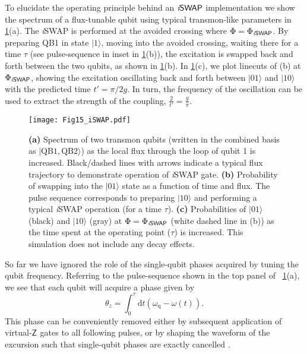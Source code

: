 \documentclass[aip,apr,twocolumn,showpacs,superscriptaddress,groupedaddress,nofootinbib,reprint]{revtex4-1}  %
\newcommand{\Z}[1]{\textsf{Z}_{#1}}
\newcommand{\iSWAP}{\emph{i}\textsf{SWAP}}
\renewcommand{\d}{\text{d}}
\begin{document}
To elucidate the operating principle behind an $\iSWAP{}$ implementation we show the spectrum of a flux-tunable qubit using typical transmon-like parameters in \cref{Fig:2qb_iSWAP}(a). The \iSWAP{} is performed at the avoided crossing where $\Phi = \Phi_{\iSWAP{}}$. By preparing QB1 in state $|1\rangle$, moving into the avoided crossing, waiting there for a time $\tau$ (see pulse-sequence in inset in \cref{Fig:2qb_iSWAP}(b)), the excitation is swapped back and forth between the two qubits, as shown in \cref{Fig:2qb_iSWAP}(b). In \cref{Fig:2qb_iSWAP}(c), we plot linecuts of (b) at $\Phi_{\iSWAP{}}$, showing the excitation oscillating back and forth between $|01\rangle$ and $|10\rangle$ with the predicted time $t' = \pi/2g$. In turn, the frequency of the oscillation can be used to extract the strength of the coupling, $\frac{2}{t'} = \frac{g}{\pi}$.
\begin{figure}[!t]
\begin{center}
\texttt{[image: Fig15\_iSWAP.pdf]}
\caption{\textbf{(a)} Spectrum of two transmon qubits (written in the combined basis as $|\text{QB1},\text{QB2}\rangle$) as the local flux through the loop of qubit 1 is increased. Black/dashed lines with arrows indicate a typical flux trajectory to demonstrate operation of \iSWAP{} gate. \textbf{(b)} Probability of swapping into the $|01\rangle$ state as a function of time and flux. The pulse sequence corresponds to preparing $|10\rangle$ and performing a typical \iSWAP{} operation (for a time $\tau$). \textbf{(c)} Probabilities of $|01\rangle$ (black) and $|10\rangle$ (gray) at $\Phi = \Phi_{\iSWAP{}}$ (white dashed line in (b)) as the time spent at the operating point ($\tau$) is increased. This simulation does not include any decay effects.}
\label{Fig:2qb_iSWAP}
\end{center}
\end{figure}

So far we have ignored the role of the single-qubit phases acquired by tuning the qubit frequency. Referring to the pulse-sequence shown in the top panel of ~\cref{Fig:2qb_iSWAP}(a), we see that each qubit will acquire a phase given by
\begin{equation}
\theta_z = \int_0^\tau \d t \left( \omega_\text{q} - \omega(t)\right).
\end{equation}
This phase can be conveniently removed either by subsequent application of virtual-$\Z{}$ gates to all following pulses\cite{McKay2017}, or by shaping the waveform of the excursion such that single-qubit phases are exactly cancelled \cite{Salathe2015}.
\end{document}
